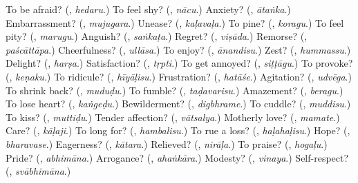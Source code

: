 \begin{tcolorbox}[breakable,colback=teal!4,colframe=teal!35!black,title={Before you move on}]
To be afraid? (\textbf{}, \emph{hedaru}.) To feel shy? (\textbf{}, \emph{nācu}.) Anxiety? (\textbf{}, \emph{ātaṅka}.) Embarrassment? (\textbf{}, \emph{mujugara}.) Unease? (\textbf{}, \emph{kaḷavaḷa}.) To pine? (\textbf{}, \emph{koragu}.) To feel pity? (\textbf{}, \emph{marugu}.) Anguish? (\textbf{}, \emph{saṅkaṭa}.) Regret? (\textbf{}, \emph{viṣāda}.) Remorse? (\textbf{}, \emph{paścāttāpa}.) Cheerfulness? (\textbf{}, \emph{ullāsa}.) To enjoy? (\textbf{}, \emph{ānandisu}.) Zest? (\textbf{}, \emph{hummassu}.) Delight? (\textbf{}, \emph{harṣa}.) Satisfaction? (\textbf{}, \emph{tṛpti}.) To get annoyed? (\textbf{}, \emph{siṭṭāgu}.) To provoke? (\textbf{}, \emph{keṇaku}.) To ridicule? (\textbf{}, \emph{hīyāḷisu}.) Frustration? (\textbf{}, \emph{hatāśe}.) Agitation? (\textbf{}, \emph{udvēga}.) To shrink back? (\textbf{}, \emph{muduḍu}.) To fumble? (\textbf{}, \emph{taḍavarisu}.) Amazement? (\textbf{}, \emph{beragu}.) To lose heart? (\textbf{}, \emph{kaṅgeḍu}.) Bewilderment? (\textbf{}, \emph{digbhrame}.) To cuddle? (\textbf{}, \emph{muddisu}.) To kiss? (\textbf{}, \emph{muttiḍu}.) Tender affection? (\textbf{}, \emph{vātsalya}.) Motherly love? (\textbf{}, \emph{mamate}.) Care? (\textbf{}, \emph{kāḷaji}.) To long for? (\textbf{}, \emph{hambalisu}.) To rue a loss? (\textbf{}, \emph{haḷahaḷisu}.) Hope? (\textbf{}, \emph{bharavase}.) Eagerness? (\textbf{}, \emph{kātara}.) Relieved? (\textbf{}, \emph{nirāḷa}.) To praise? (\textbf{}, \emph{hogaḷu}.) Pride? (\textbf{}, \emph{abhimāna}.) Arrogance? (\textbf{}, \emph{ahaṅkāra}.) Modesty? (\textbf{}, \emph{vinaya}.) Self-respect? (\textbf{}, \emph{svābhimāna}.)
\end{tcolorbox}
